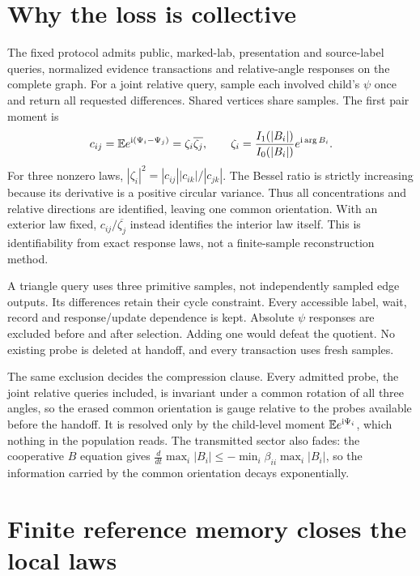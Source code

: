 \section{Why the loss is collective}

The fixed protocol admits public, marked-lab, presentation and source-label queries, normalized evidence transactions and relative-angle responses on the complete graph. For a joint relative query, sample each involved child's $\psi$ once and return all requested differences. Shared vertices share samples. The first pair moment is
\begin{equation}
 c_{ij}=\mathbb E e^{\mathrm i(\Psi_i-\Psi_j)}=\zeta_i\overline{\zeta_j},\qquad
 \zeta_i=\frac{I_1(|B_i|)}{I_0(|B_i|)}e^{\mathrm i\arg B_i}.
 \label{clp:relative}
\end{equation}
For three nonzero laws, $|\zeta_i|^2=|c_{ij}||c_{ik}|/|c_{jk}|$. The Bessel ratio is strictly increasing because its derivative is a positive circular variance. Thus all concentrations and relative directions are identified, leaving one common orientation. With an exterior law fixed, $c_{ij}/\overline{\zeta_j}$ instead identifies the interior law itself. This is identifiability from exact response laws, not a finite-sample reconstruction method.

A triangle query uses three primitive samples, not independently sampled edge outputs. Its differences retain their cycle constraint. Every accessible label, wait, record and response/update dependence is kept. Absolute $\psi$ responses are excluded before and after selection. Adding one would defeat the quotient. No existing probe is deleted at handoff, and every transaction uses fresh samples.

The same exclusion decides the compression clause. Every admitted probe, the joint relative queries included, is invariant under a common rotation of all three angles, so the erased common orientation is gauge relative to the probes available before the handoff. It is resolved only by the child-level moment $\mathbb E e^{\mathrm i\Psi_i}$, which nothing in the population reads. The transmitted sector also fades: the cooperative $B$ equation gives $\frac{d}{dt}\max_i|B_i|\leq-\min_i\beta_{ii}\max_i|B_i|$, so the information carried by the common orientation decays exponentially.

\section{Finite reference memory closes the local laws}

